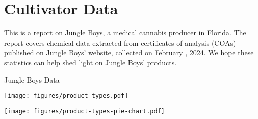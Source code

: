 \documentclass[../article.tex, 12pt]{subfiles}
\begin{document}
%


\section*{Cultivator Data}
\label{sec:introduction}
\thispagestyle{regular}

This is a report on Jungle Boys, a medical cannabis producer in Florida. The report covers chemical data extracted from certificates of analysis (COAs) published on Jungle Boys' website, collected on February , 2024. We hope these statistics can help shed light on Jungle Boys' products.


\vspace{1\baselineskip}

{
\noindent Jungle Boys Data\\[0.25\baselineskip]

}

\vspace{2\baselineskip}

\begin{center}
\texttt{[image: figures/product-types.pdf]}
\end{center}

\vspace{1\baselineskip}

\begin{center}
\texttt{[image: figures/product-types-pie-chart.pdf]}
\end{center}
\end{document}
